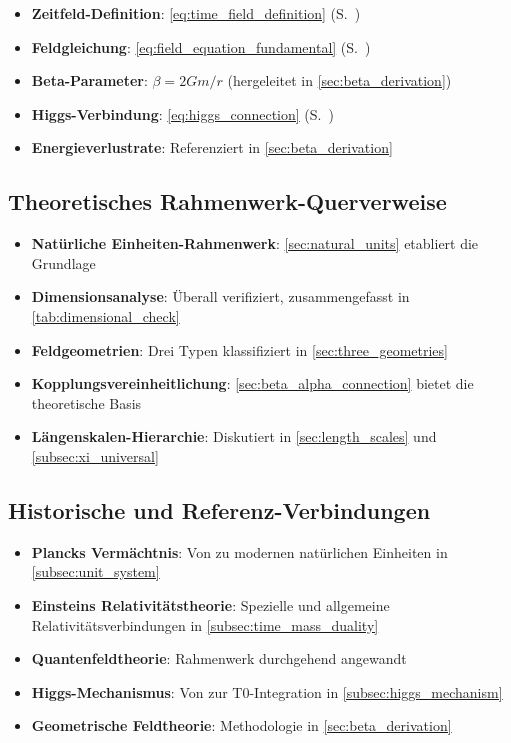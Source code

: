 \documentclass[12pt,a4paper]{article}
\begin{document}
	\begin{itemize}
		\item \textbf{Zeitfeld-Definition}: \cref{eq:time_field_definition} (S.~\pageref{eq:time_field_definition})
		\item \textbf{Feldgleichung}: \cref{eq:field_equation_fundamental} (S.~\pageref{eq:field_equation_fundamental})
		\item \textbf{Beta-Parameter}: $\beta = 2Gm/r$ (hergeleitet in \cref{sec:beta_derivation})
		\item \textbf{Higgs-Verbindung}: \cref{eq:higgs_connection} (S.~\pageref{eq:higgs_connection})
		\item \textbf{Energieverlustrate}: Referenziert in \cref{sec:beta_derivation}
	\end{itemize}
	
	\subsection{Theoretisches Rahmenwerk-Querverweise}
	\label{app:theoretical_framework}
	
	\begin{itemize}
		\item \textbf{Natürliche Einheiten-Rahmenwerk}: \cref{sec:natural_units} etabliert die Grundlage
		\item \textbf{Dimensionsanalyse}: Überall verifiziert, zusammengefasst in \cref{tab:dimensional_check}
		\item \textbf{Feldgeometrien}: Drei Typen klassifiziert in \cref{sec:three_geometries}
		\item \textbf{Kopplungsvereinheitlichung}: \cref{sec:beta_alpha_connection} bietet die theoretische Basis
		\item \textbf{Längenskalen-Hierarchie}: Diskutiert in \cref{sec:length_scales} und \cref{subsec:xi_universal}
	\end{itemize}
	
	\subsection{Historische und Referenz-Verbindungen}
	\label{app:historical_connections}
	
	\begin{itemize}
		\item \textbf{Plancks Vermächtnis}: Von \citet{planck1900,planck1906} zu modernen natürlichen Einheiten in \cref{subsec:unit_system}
		\item \textbf{Einsteins Relativitätstheorie}: Spezielle \citep{einstein1905} und allgemeine \citep{einstein1915} Relativitätsverbindungen in \cref{subsec:time_mass_duality}
		\item \textbf{Quantenfeldtheorie}: \citet{weinberg1995,peskin1995} Rahmenwerk durchgehend angewandt
		\item \textbf{Higgs-Mechanismus}: Von \citet{higgs1964,englert1964} zur T0-Integration in \cref{subsec:higgs_mechanism}
		\item \textbf{Geometrische Feldtheorie}: \citet{misner1973} Methodologie in \cref{sec:beta_derivation}
	\end{itemize}
	
\end{document}
